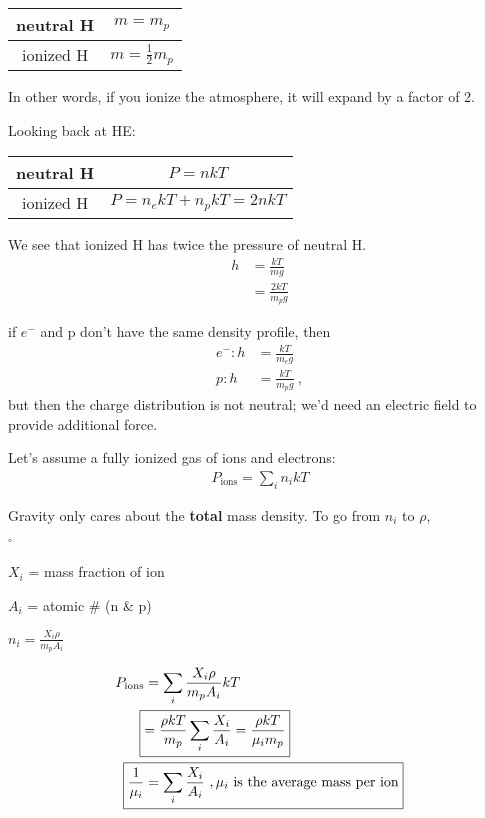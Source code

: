 \begin{center}
\begin{tabular}{c|c}
\hline
neutral H & $m=m_p$ \\ \hline
ionized H & $m=\frac{1}{2}m_p$ \\ \hline
\end{tabular}
\end{center}

In other words, if you ionize the atmosphere, it will expand by a factor of 2.

Looking back at HE: 
\begin{center}
\begin{tabular}{c|c}
\hline
neutral H & $P=nkT$ \\ \hline
ionized H & $P =n_ekT + n_pkT = 2nkT$ \\ \hline
\end{tabular}
\end{center}

We see that ionized H has twice the pressure of neutral H.
\begin{align}
h &= \frac{kT}{mg}\\
&=\frac{2kT}{m_pg}
\end{align}

if $e^-$ and p don't have the same density profile, then
\begin{align}
e^- : h&= \frac{kT}{m_eg}\\
p: h&= \frac{kT}{m_pg}~,
\end{align}
but then the charge distribution is not neutral; we'd need an electric field to provide additional force. 

Let's assume a fully ionized gas of ions and electrons:
\begin{align}
P_{\textrm{ions}} = \sum_i n_ikT
\end{align}

Gravity only cares about the \textbf{total} mass density. To go from $n_i$ to $\rho$,
\begin{list}{$^\circ$}{}
\item $X_i$ = mass fraction of ion
\item $A_i$ = atomic \# (n \& p)
\item $n_i = \frac{X_i \rho}{m_pA_i}$
\end{list}

\begin{align}
P_{\textrm{ions}} &= \sum_i \frac{X_i \rho}{m_p A_i}kT\\
\Aboxed{&= \frac{\rho kT}{m_p} \sum_i \frac{X_i}{A_i} = \frac{\rho kT}{\mu_i m_p}}\\
\Aboxed{\frac{1}{\mu_i} &= \sum_i \frac{X_i}{A_i}~,\mu_i\textrm{ is the average mass per ion}}
\end{align}

